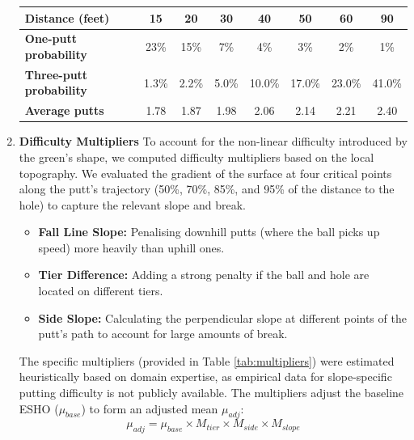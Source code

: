 \documentclass[11pt, letterpaper]{article}
\begin{document}
\begin{enumerate}
\begin{table}[h!]
    \vspace{0.2cm} 

    \begin{tabular}{l|*{7}{c}}
        \toprule
        \textbf{Distance (feet)} & 15 & 20 & 30 & 40 & 50 & 60 & 90  \\
        \midrule
        \textbf{One-putt probability} & 23\% & 15\% & 7\% & 4\% & 3\% & 2\% & 1\%   \\
        \textbf{Three-putt probability} & 1.3\% & 2.2\% & 5.0\% & 10.0\% & 17.0\% & 23.0\% & 41.0\%  \\
        \textbf{Average putts} & 1.78 & 1.87 & 1.98 & 2.06 & 2.14 & 2.21 & 2.40  \\
        \bottomrule
    \end{tabular}
\end{table}

\item \textbf{Difficulty Multipliers}
To account for the non-linear difficulty introduced by the green's shape, we computed difficulty multipliers based on the local topography. We evaluated the gradient of the surface at four critical points along the putt's trajectory (50\%, 70\%, 85\%, and 95\% of the distance to the hole) to capture the relevant slope and break.

\begin{itemize}
    \item \textbf{Fall Line Slope:} Penalising downhill putts (where the ball picks up speed) more heavily than uphill ones.
    \item \textbf{Tier Difference:} Adding a strong penalty if the ball and hole are located on different tiers.
    \item \textbf{Side Slope:} Calculating the perpendicular slope at different points of the putt's path to account for large amounts of break.
\end{itemize}

The specific multipliers (provided in Table \ref{tab:multipliers}) were estimated heuristically based on domain expertise, as empirical data for slope-specific putting difficulty is not publicly available. The multipliers adjust the baseline ESHO ($\mu_{base}$) to form an adjusted mean $\mu_{adj}$:
\[ \mu_{adj} = \mu_{base} \times M_{tier} \times M_{side} \times M_{slope} \]


\end{enumerate}
\end{document}
